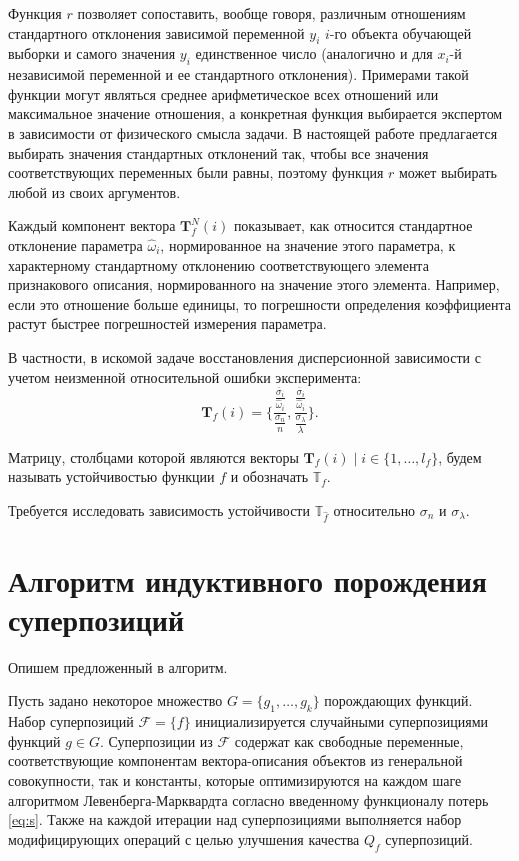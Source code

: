 \documentclass[11pt,a4paper]{article}
\theoremstyle{definition}
\begin{document}
Функция $r$ позволяет сопоставить, вообще говоря, различным отношениям стандартного
отклонения зависимой переменной $y_i$ $i$-го объекта обучающей выборки и самого значения $y_i$
единственное число (аналогично и для $x_i$-й независимой переменной и ее стандартного отклонения).
Примерами такой функции могут являться среднее арифметическое
всех отношений или максимальное значение отношения, а конкретная функция выбирается
экспертом в зависимости от физического смысла задачи.
В настоящей работе предлагается выбирать значения стандартных отклонений так, чтобы
все значения соответствующих переменных были равны, поэтому функция $r$ может выбирать
любой из своих аргументов.

Каждый компонент вектора $\mathbf{T}^N_f(i)$ показывает, как относится стандартное отклонение
параметра $\hat{\omega}_i$, нормированное на значение этого параметра, к характерному стандартному
отклонению соответствующего элемента признакового описания, нормированного на значение этого
элемента. Например, если это отношение больше единицы, то погрешности определения коэффициента
растут быстрее погрешностей измерения параметра.

В частности, в искомой задаче восстановления дисперсионной зависимости с учетом неизменной
относительной ошибки эксперимента:
\[
  \mathbf{T}_f(i) = \Big\{ \frac{\frac{\overline{\sigma}_i}{\hat{\omega}_i}}{\frac{\sigma_n}{n}}, \frac{\frac{\overline{\sigma}_i}{\hat{\omega}_i}}{\frac{\sigma_{\lambda}}{\lambda}} \Big\}.
\]

Матрицу, столбцами которой являются векторы $\mathbf{T}_f(i) \mid i \in \{ 1, \dots, l_f \}$,
будем называть устойчивостью функции $f$ и обозначать $\mathbb{T}_f$.

Требуется исследовать зависимость устойчивости $\mathbb{T}_{\hat{f}}$ относительно
$\sigma_n$ и $\sigma_{\lambda}$.

\section{Алгоритм индуктивного порождения суперпозиций}

Опишем предложенный в \cite{Rudoy13} алгоритм.

Пусть задано некоторое множество $G = \{ g_1, \dots, g_k \}$ 
порождающих функций. Набор суперпозиций $\mathcal{F} = \{ f \}$
инициализируется случайными суперпозициями функций $g \in G$. Суперпозиции из
$\mathcal{F}$ содержат как свободные переменные, соответствующие
компонентам вектора-описания объектов из генеральной совокупности, так и
константы, которые оптимизируются на каждом шаге алгоритмом Левенберга-Марквардта
согласно введенному функционалу потерь \eqref{eq:s}. Также на каждой итерации
над суперпозициями выполняется набор модифицирующих операций с целью улучшения
качества $Q_f$ суперпозиций.
\end{document}
